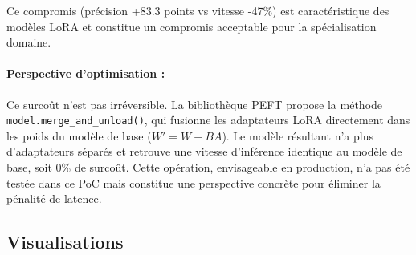 Ce compromis (précision +83.3 points vs vitesse -47\%) est caractéristique des modèles LoRA et constitue un compromis acceptable pour la spécialisation domaine.

\paragraph{Perspective d'optimisation :}
Ce surcoût n'est pas irréversible. La bibliothèque PEFT propose la méthode \texttt{model.merge\_and\_unload()}, qui fusionne les adaptateurs LoRA directement dans les poids du modèle de base ($W' = W + BA$). Le modèle résultant n'a plus d'adaptateurs séparés et retrouve une vitesse d'inférence identique au modèle de base, soit 0\% de surcoût. Cette opération, envisageable en production, n'a pas été testée dans ce PoC mais constitue une perspective concrète pour éliminer la pénalité de latence.

\subsection{Visualisations}

